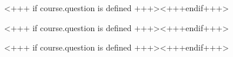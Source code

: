 \documentclass[english,xcolor=pdftex,dvipsnames]{beamer}
\begin{document}

<+++ if course.question is defined +++><+++endif+++> 


<+++ if course.question is defined +++><+++endif+++>


<+++ if course.question is defined +++><+++endif+++>

%  
\end{document}
